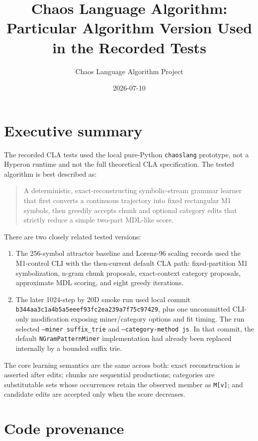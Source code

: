 \documentclass[11pt]{article}
\title{Chaos Language Algorithm: Particular Algorithm Version Used in the Recorded Tests}
\author{Chaos Language Algorithm Project}
\date{2026-07-10}
\begin{document}
\maketitle

\section{Executive summary}

The recorded CLA tests used the local pure-Python \texttt{chaoslang} prototype, not a Hyperon runtime and not the full theoretical CLA specification. The tested algorithm is best described as:

\begin{quote}
A deterministic, exact-reconstructing symbolic-stream grammar learner that first converts a continuous trajectory into fixed rectangular M1 symbols, then greedily accepts chunk and optional category edits that strictly reduce a simple two-part MDL-like score.
\end{quote}

There are two closely related tested versions:

\begin{enumerate}[leftmargin=*]
\item The 256-symbol attractor baseline and Lorenz-96 scaling records used the M1-control CLI with the then-current default CLA path: fixed-partition M1 symbolization, n-gram chunk proposals, exact-context category proposals, approximate MDL scoring, and eight greedy iterations.
\item The later 1024-step by 20D smoke run used local commit \texttt{b344aa3c1a4b5a5eeef93fc2ea239a7f75c97429}, plus one uncommitted CLI-only modification exposing miner/category options and fit timing. The run selected \texttt{--miner suffix\_trie} and \texttt{--category-method js}. In that commit, the default \texttt{NGramPatternMiner} implementation had already been replaced internally by a bounded suffix trie.
\end{enumerate}

The core learning semantics are the same across both: exact reconstruction is asserted after edits; chunks are sequential productions; categories are substitutable sets whose occurrences retain the observed member as \texttt{M[v]}; and candidate edits are accepted only when the score decreases.

\section{Code provenance}
\end{document}
